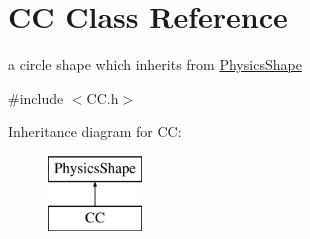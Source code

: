 \hypertarget{class_c_c}{\section{C\+C Class Reference}
\label{class_c_c}
}


a circle shape which inherits from \hyperlink{class_physics_shape}{Physics\+Shape}  




{\ttfamily \#include $<$C\+C.\+h$>$}

Inheritance diagram for C\+C\+:\begin{figure}[H]
\begin{center}
\leavevmode
\includegraphics[height=2.000000cm]{class_c_c}
\end{center}
\end{figure}
